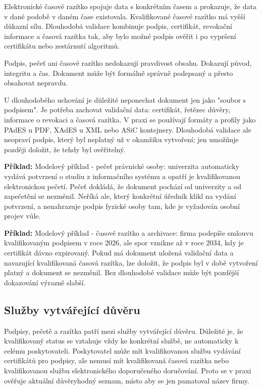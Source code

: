 \documentclass[11pt,a4paper]{article}
\newcommand{\priklad}[1]{\begin{tcolorbox}[breakable,enhanced,colback=green!7,colframe=green!30!black,boxrule=0pt,arc=1mm,left=5pt,right=5pt,top=5pt,bottom=5pt,before skip=6pt,after skip=6pt]\textbf{Příklad:} #1\end{tcolorbox}}
\begin{document}
Elektronické časové razítko spojuje data s konkrétním časem a prokazuje, že data v dané podobě v daném čase existovala. Kvalifikované časové razítko má vyšší důkazní sílu. Dlouhodobá validace kombinuje podpis, certifikát, revokační informace a časová razítka tak, aby bylo možné podpis ověřit i po vypršení certifikátu nebo zestárnutí algoritmů.

Podpis, pečeť ani časové razítko nedokazují pravdivost obsahu. Dokazují původ, integritu a čas. Dokument může být formálně správně podepsaný a přesto obsahovat nepravdu.

U dlouhodobého uchování je důležité neponechat dokument jen jako "soubor s podpisem". Je potřeba zachovat validační data: certifikát, řetězec důvěry, informace o revokaci a časová razítka. V praxi se používají formáty a profily jako PAdES u PDF, XAdES u XML nebo ASiC kontejnery. Dlouhodobá validace ale neopraví podpis, který byl neplatný už v okamžiku vytvoření; jen umožňuje později doložit, že tehdy byl ověřitelný.

\priklad{Modelový příklad - pečeť právnické osoby: univerzita automaticky vydává potvrzení o studiu z informačního systému a opatří je kvalifikovanou elektronickou pečetí. Pečeť dokládá, že dokument pochází od univerzity a od zapečetění se nezměnil. Neříká ale, který konkrétní úředník klikl na vydání potvrzení, a nenahrazuje podpis fyzické osoby tam, kde je vyžadován osobní projev vůle.}

\priklad{Modelový příklad - časové razítko a archivace: firma podepíše smlouvu kvalifikovaným podpisem v roce 2026, ale spor vznikne až v roce 2034, kdy je certifikát dávno expirovaný. Pokud má dokument uložená validační data a navazující kvalifikovaná časová razítka, lze doložit, že podpis byl v době vytvoření platný a dokument se nezměnil. Bez dlouhodobé validace může být pozdější dokazování výrazně slabší.}

\subsection*{Služby vytvářející důvěru}
Podpisy, pečetě a razítka patří mezi služby vytvářející důvěru. Důležité je, že kvalifikovaný status se vztahuje vždy ke konkrétní službě, ne automaticky k celému poskytovateli. Poskytovatel může mít kvalifikovanou službu vydávání certifikátů pro podpisy, ale nemusí mít kvalifikovaná časová razítka nebo kvalifikovanou službu elektronického doporučeného doručování. Proto se v praxi ověřuje aktuální důvěryhodný seznam, místo aby se jen pamatoval název firmy.
\end{document}
